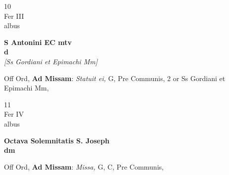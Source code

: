 \documentclass[10pt, openany]{book}
\begin{document}
        \begin{center}
            \begin{minipage}{3.5in}
                \vspace{2em}
                \begin{minipage}{0.5in}
                    {\Huge 10} \\
                    {\normalsize Fer III} \\
                    {\normalsize albus}
                \end{minipage}
                \begin{minipage}{3.0in}
                    \textbf{ \large S Antonini EC mtv \\
                    \textnormal{\normalsize d}} \\ \textit{[Ss Gordiani et Epimachi Mm]} \\ 
                \end{minipage}
                \begin{justify}Off Ord, \textbf{Ad Missam}: \textit{Statuit ei,} G, Pre Communis, 2 or Ss Gordiani et Epimachi Mm,   
                \end{justify}
            \end{minipage}
        \end{center}
    
        \begin{center}
            \begin{minipage}{3.5in}
                \vspace{2em}
                \begin{minipage}{0.5in}
                    {\Huge 11} \\
                    {\normalsize Fer IV} \\
                    {\normalsize albus}
                \end{minipage}
                \begin{minipage}{3.0in}
                    \textbf{ \large Octava Solemnitatis S. Joseph \\
                    \textnormal{\normalsize dm}} \\ 
                \end{minipage}
                \begin{justify}Off Ord, \textbf{Ad Missam}: \textit{Missa,} G, C, Pre Communis,   
                \end{justify}
            \end{minipage}
        \end{center}
    
\end{document}
